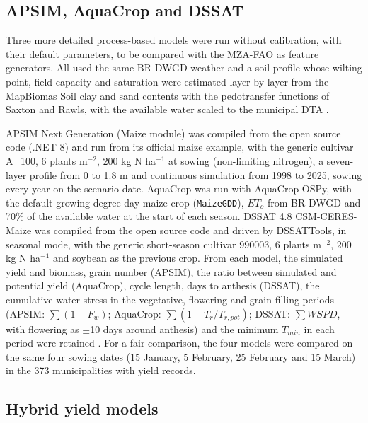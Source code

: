 \documentclass[10pt,a4paper]{article}
\begin{document}
\subsection{APSIM, AquaCrop and DSSAT}
\label{subsec:otros}

Three more detailed process-based models were run without calibration, with their default parameters,
to be compared with the MZA-FAO as feature generators. All used the same BR-DWGD weather and a soil
profile whose wilting point, field capacity and saturation were estimated layer by layer from the
MapBiomas Soil clay and sand contents with the pedotransfer functions of Saxton and Rawls, with the
available water scaled to the municipal DTA \citep{saxton2006}.

APSIM Next Generation (Maize module) was compiled from the open source code (.NET 8) and run from its
official maize example, with the generic cultivar A\_100, 6 plants m$^{-2}$, 200 kg N ha$^{-1}$ at sowing
(non-limiting nitrogen), a seven-layer profile from 0 to 1.8 m and continuous simulation from 1998 to
2025, sowing every year on the scenario date. AquaCrop was run with AquaCrop-OSPy, with the default
growing-degree-day maize crop (\texttt{MaizeGDD}), $ET_o$ from BR-DWGD and 70\% of the available water at
the start of each season. DSSAT 4.8 CSM-CERES-Maize was compiled from the open source code and driven by
DSSATTools, in seasonal mode, with the generic short-season cultivar 990003, 6 plants m$^{-2}$,
200 kg N ha$^{-1}$ and soybean as the previous crop. From each model, the simulated yield and biomass,
grain number (APSIM), the ratio between simulated and potential yield (AquaCrop), cycle length, days to
anthesis (DSSAT), the cumulative water stress in the vegetative, flowering and grain filling periods
(APSIM: $\sum(1 - F_w)$; AquaCrop: $\sum(1 - T_r/T_{r,pot})$; DSSAT: $\sum WSPD$, with flowering as
$\pm$10 days around anthesis) and the minimum $T_{min}$ in each period were retained
\citep{holzworth2014, steduto2009, kelly2021, jones2003}. For a fair comparison, the four models were
compared on the same four sowing dates (15 January, 5 February, 25 February and 15 March) in the 373
municipalities with yield records.

\subsection{Hybrid yield models}
\label{subsec:hybrid}
\end{document}
